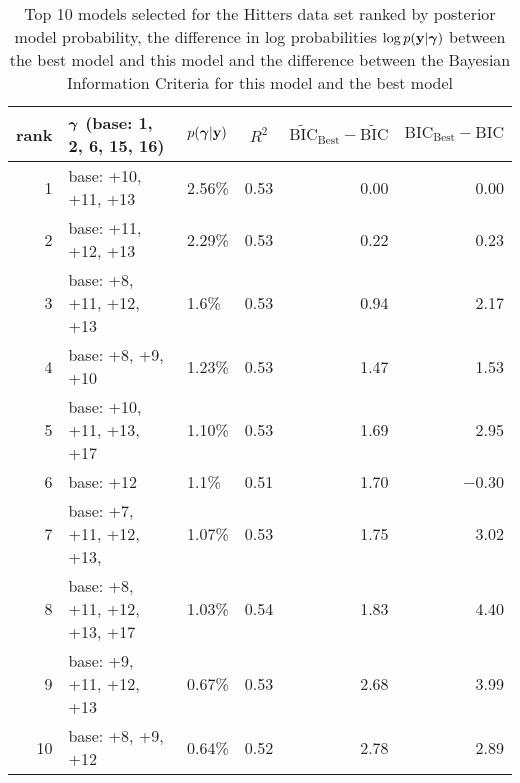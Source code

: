 \documentclass{amsart}
\begin{document}
\begin{table}
\label{tab:numerical_results_hitters}
\caption{Top 10 models selected for the Hitters data set ranked by posterior model probability, the difference
					in log probabilities $\log p({\bf y}|{\boldsymbol \gamma})$ between the best model and this model and the difference
					between the Bayesian Information Criteria for this model and the best model}
\begin{center}
\begin{tabular}{r|l|l|c|r|r}
rank & ${\boldsymbol \gamma}$ (base: 1, 2, 6, 15, 16) & $p({\boldsymbol \gamma}|{\bf y})$ & $R^2$ & $\widetilde{\text{BIC}}_\text{Best} - \widetilde{\text{BIC}}$ & $\text{BIC}_\text{Best} - \text{BIC}$ \\
\hline
1  & base: +10, +11, +13&  2.56\%&  0.53&  0.00&  0.00\\
2  & base: +11, +12, +13&  2.29\%&  0.53&  0.22&  0.23\\
3  & base: +8, +11, +12, +13&  1.6\%&  0.53&  0.94&  2.17\\
4  & base: +8, +9, +10&  1.23\%&  0.53&  1.47&  1.53\\
5  & base: +10, +11, +13, +17&  1.10\%&  0.53&  1.69&  2.95\\
6  & base: +12&  1.1\%&  0.51&  1.70&  $-$0.30\\
7  & base: +7, +11, +12, +13,&  1.07\%&  0.53&  1.75&  3.02\\
8  & base: +8, +11, +12, +13, +17&  1.03\%&  0.54&  1.83&  4.40\\
9  & base: +9, +11, +12, +13&  0.67\%&  0.53&  2.68&  3.99\\
10 & base: +8, +9, +12&  0.64\%&  0.52&  2.78&  2.89\\
\end{tabular}
\end{center}
\end{table}
\end{document}
